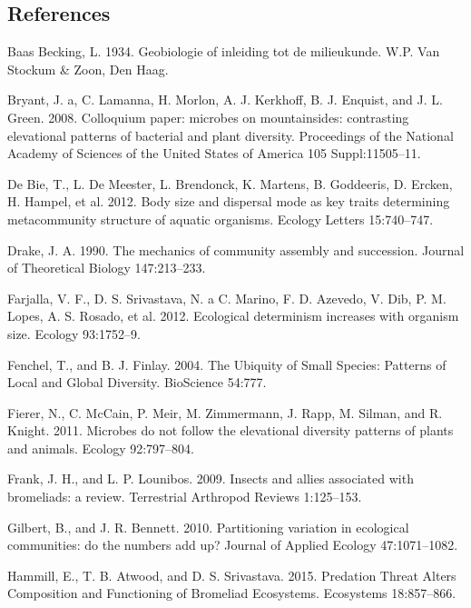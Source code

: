 \documentclass[12pt,]{article}
\begin{document}
\subsection{References}\label{references}

\hypertarget{refs}{}
\hypertarget{ref-BaasBecking1934}{}
Baas Becking, L. 1934. Geobiologie of inleiding tot de milieukunde. W.P.
Van Stockum \& Zoon, Den Haag.

\hypertarget{ref-Bryant2008}{}
Bryant, J. a, C. Lamanna, H. Morlon, A. J. Kerkhoff, B. J. Enquist, and
J. L. Green. 2008. Colloquium paper: microbes on mountainsides:
contrasting elevational patterns of bacterial and plant diversity.
Proceedings of the National Academy of Sciences of the United States of
America 105 Suppl:11505--11.

\hypertarget{ref-DeBie2012a}{}
De Bie, T., L. De Meester, L. Brendonck, K. Martens, B. Goddeeris, D.
Ercken, H. Hampel, et al. 2012. Body size and dispersal mode as key
traits determining metacommunity structure of aquatic organisms. Ecology
Letters 15:740--747.

\hypertarget{ref-Drake1990}{}
Drake, J. A. 1990. The mechanics of community assembly and succession.
Journal of Theoretical Biology 147:213--233.

\hypertarget{ref-Farjalla2012}{}
Farjalla, V. F., D. S. Srivastava, N. a C. Marino, F. D. Azevedo, V.
Dib, P. M. Lopes, A. S. Rosado, et al. 2012. Ecological determinism
increases with organism size. Ecology 93:1752--9.

\hypertarget{ref-Fenchel2004}{}
Fenchel, T., and B. J. Finlay. 2004. The Ubiquity of Small Species:
Patterns of Local and Global Diversity. BioScience 54:777.

\hypertarget{ref-Fierer2011}{}
Fierer, N., C. McCain, P. Meir, M. Zimmermann, J. Rapp, M. Silman, and
R. Knight. 2011. Microbes do not follow the elevational diversity
patterns of plants and animals. Ecology 92:797--804.

\hypertarget{ref-Frank2009}{}
Frank, J. H., and L. P. Lounibos. 2009. Insects and allies associated
with bromeliads: a review. Terrestrial Arthropod Reviews 1:125--153.

\hypertarget{ref-Gilbert2010}{}
Gilbert, B., and J. R. Bennett. 2010. Partitioning variation in
ecological communities: do the numbers add up? Journal of Applied
Ecology 47:1071--1082.

\hypertarget{ref-Hammill2015}{}
Hammill, E., T. B. Atwood, and D. S. Srivastava. 2015. Predation Threat
Alters Composition and Functioning of Bromeliad Ecosystems. Ecosystems
18:857--866.
\end{document}
